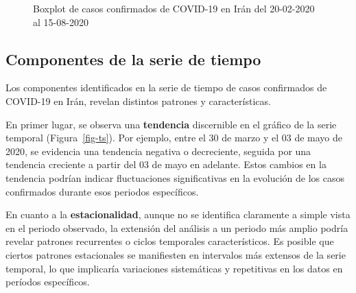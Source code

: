 \documentclass[
  letterpaper,
  DIV=11,
  numbers=noendperiod]{scrreport}
\theoremstyle{plain}
\theoremstyle{definition}
\theoremstyle{definition}
\theoremstyle{plain}
\theoremstyle{remark}
\begin{document}
\begin{figure}


\caption{\label{fig-box}Boxplot de casos confirmados de COVID-19 en Irán
del 20-02-2020 al 15-08-2020}

\end{figure}%

\subsection{Componentes de la serie de
tiempo}\label{componentes-de-la-serie-de-tiempo}

Los componentes identificados en la serie de tiempo de casos confirmados
de COVID-19 en Irán, revelan distintos patrones y características.

En primer lugar, se observa una \textbf{tendencia} discernible en el
gráfico de la serie temporal (Figura~\ref{fig-ts}). Por ejemplo, entre
el 30 de marzo y el 03 de mayo de 2020, se evidencia una tendencia
negativa o decreciente, seguida por una tendencia creciente a partir del
03 de mayo en adelante. Estos cambios en la tendencia podrían indicar
fluctuaciones significativas en la evolución de los casos confirmados
durante esos periodos específicos.

En cuanto a la \textbf{estacionalidad}, aunque no se identifica
claramente a simple vista en el periodo observado, la extensión del
análisis a un periodo más amplio podría revelar patrones recurrentes o
ciclos temporales característicos. Es posible que ciertos patrones
estacionales se manifiesten en intervalos más extensos de la serie
temporal, lo que implicaría variaciones sistemáticas y repetitivas en
los datos en períodos específicos.
\end{document}
